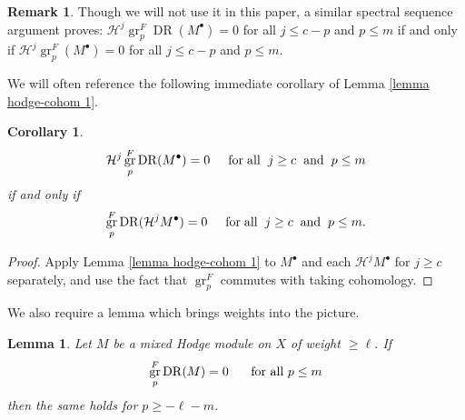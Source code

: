 \documentclass[11pt]{amsart}
\newtheorem{lemma}[equation]{Lemma}
\newtheorem{corollary}[equation]{Corollary}
\theoremstyle{definition}
\newtheorem{remark}[equation]{Remark}
\theoremstyle{plain}
\DeclareMathOperator{\gr}{gr}
\DeclareMathOperator{\dr}{DR}
\begin{document}
\begin{remark}
Though we will not use it in this paper, a similar spectral sequence argument proves: $\mathcal{H}^{j} \gr_p^F \dr( M^\bullet) = 0$ for all $j \leq c-p$ and $p \leq m$ if and only if $\mathcal{H}^{j} \gr_p^F( M^\bullet) = 0$ for all $j \leq c-p$ and $p \leq m$.
\end{remark}

We will often reference the following immediate corollary of Lemma \ref{lemma hodge-cohom 1}.

\begin{corollary}\label{cor hodge-cohom 1}
\begin{align*}
    \mathcal{H}^{j} \gr_p^F \dr( M^\bullet) = 0 \hspace{.5cm} \mathrm{for} \hspace{.1cm} \mathrm{all} \hspace{.2cm} j \geq c \hspace{.2cm} \mathrm{and} \hspace{.2cm} p \leq m
\end{align*}
if and only if
\begin{align*}
     \gr_p^F \dr (\mathcal{H}^j M^\bullet) = 0 \hspace{.5cm} \mathrm{for} \hspace{.1cm} \mathrm{all} \hspace{.2cm} j \geq c \hspace{.2cm} \mathrm{and} \hspace{.2cm} p \leq m.
\end{align*}
\end{corollary}

\begin{proof}
Apply Lemma \ref{lemma hodge-cohom 1} to $M^\bullet$ and each $\mathcal{H}^j M^\bullet$ for $j \geq c$ separately, and use the fact that $\gr_p^F$ commutes with taking cohomology.
\end{proof}

We also require a lemma which brings weights into the picture.

\begin{lemma}\label{lemma hodge-weight}
Let $M$ be a mixed Hodge module on $X$ of weight $\geq \ell$. If
\begin{align*}
    \gr_{p}^F \dr(M) = 0 \hspace{.5cm} \text{ for all } p \leq m
\end{align*}
then the same holds for $p \geq -\ell - m$.
\end{lemma}
\end{document}
